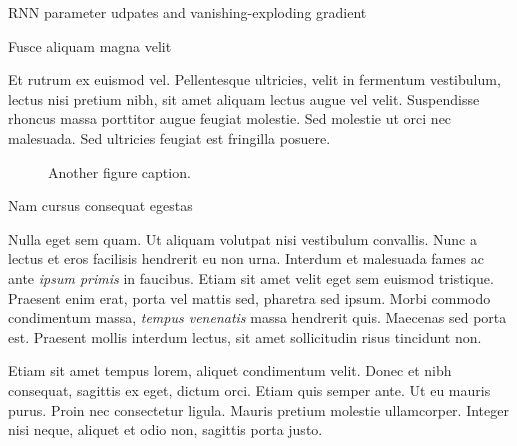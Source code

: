 \documentclass[final]{beamer}
\newlength{\colwidth}
\begin{document}
\begin{frame}[t]
\begin{columns}[t]
\begin{column}{\colwidth}
\begin{block}{RNN parameter udpates and vanishing-exploding gradient}
\end{block}

  \begin{block}{Fusce aliquam magna velit}

    Et rutrum ex euismod vel. Pellentesque ultricies, velit in fermentum
    vestibulum, lectus nisi pretium nibh, sit amet aliquam lectus augue vel
    velit. Suspendisse rhoncus massa porttitor augue feugiat molestie. Sed
    molestie ut orci nec malesuada. Sed ultricies feugiat est fringilla
    posuere.

    \begin{figure}
      \centering
      \caption{Another figure caption.}
    \end{figure}

  \end{block}

  \begin{block}{Nam cursus consequat egestas}

    Nulla eget sem quam. Ut aliquam volutpat nisi vestibulum convallis. Nunc a
    lectus et eros facilisis hendrerit eu non urna. Interdum et malesuada fames
    ac ante \textit{ipsum primis} in faucibus. Etiam sit amet velit eget sem
    euismod tristique. Praesent enim erat, porta vel mattis sed, pharetra sed
    ipsum. Morbi commodo condimentum massa, \textit{tempus venenatis} massa
    hendrerit quis. Maecenas sed porta est. Praesent mollis interdum lectus,
    sit amet sollicitudin risus tincidunt non.

    Etiam sit amet tempus lorem, aliquet condimentum velit. Donec et nibh
    consequat, sagittis ex eget, dictum orci. Etiam quis semper ante. Ut eu
    mauris purus. Proin nec consectetur ligula. Mauris pretium molestie
    ullamcorper. Integer nisi neque, aliquet et odio non, sagittis porta justo.


\end{block}
\end{column}
\end{columns}
\end{frame}
\end{document}
